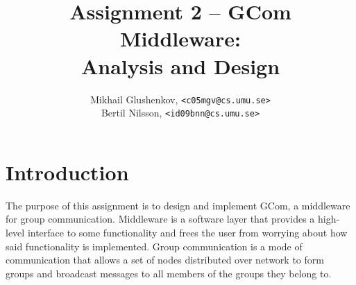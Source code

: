 \documentclass[10pt, oneside]{article}
\author{Mikhail Glushenkov, \texttt{<c05mgv@cs.umu.se>}\\
        Bertil Nilsson, \texttt{<id09bnn@cs.umu.se>}}
\title{Assignment 2 -- GCom Middleware:\\Analysis and Design}
\begin{document}
\pagestyle{plain}


\pagebreak

\setlength{\parindent}{0pt}
\setlength{\parskip}{10pt}

\setcounter{section}{-1}

\section{Introduction}

The purpose of this assignment is to design and implement GCom, a middleware for
group communication. Middleware is a software layer that provides a high-level
interface to some functionality and frees the user from worrying about how said
functionality is implemented. Group communication is a mode of communication
that allows a set of nodes distributed over network to form groups and broadcast
messages to all members of the groups they belong to.
\end{document}
